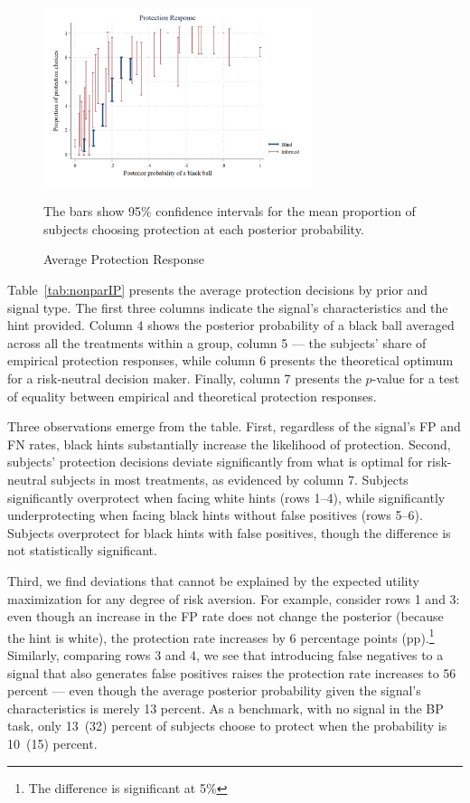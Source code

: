 \documentclass[12pt,a4paper]{article}
\newcommand{\fnote}[1]{\captionsetup{font={small, it}, aboveskip=0pt} \caption*{#1}}
\begin{document}
\begin{figure}[H]
\centering
\caption{Average Protection Response} \label{fig:ProtResponse}
  \includegraphics[width=0.7\textwidth]{Graphs/ip_response_comp.png}
\fnote{The bars show 95\% confidence intervals for the mean proportion of subjects choosing protection at each posterior probability.}
\end{figure}

Table~\ref{tab:nonparIP} presents the average protection decisions by prior and signal type. The first three columns indicate the signal's characteristics and the hint provided. Column 4 shows the posterior probability of a black ball averaged across all the treatments within a group, column 5 --- the subjects' share of empirical protection responses, while column 6 presents the theoretical optimum for a risk-neutral decision maker. Finally, column 7 presents the $p$-value for a test of equality between empirical and theoretical protection responses.

Three observations emerge from the table. First, regardless of the signal's FP and FN rates, black hints substantially increase the likelihood of protection.  Second, subjects' protection decisions deviate significantly from what is optimal for risk-neutral subjects in most treatments, as evidenced by column 7. Subjects significantly overprotect when facing white hints (rows 1--4), while significantly underprotecting when facing black hints without false positives (rows 5--6).  Subjects overprotect for black hints with false positives, though the difference is not statistically significant. 

Third, we find deviations that cannot be explained by the expected utility maximization for any degree of risk aversion. For example, consider rows 1 and 3: even though an increase in the FP rate does not change the posterior (because the hint is white), the protection rate increases by 6 percentage points (pp).\footnote{The difference is significant at 5\%} Similarly, comparing rows 3 and 4, we see that introducing false negatives to a signal that also generates false positives raises the protection rate increases to 56 percent --- even though the average posterior probability given the signal's characteristics is merely 13 percent. As a benchmark, with no signal in the BP task, only 13~(32) percent of subjects choose to protect when the probability is 10~(15) percent. 
\end{document}
